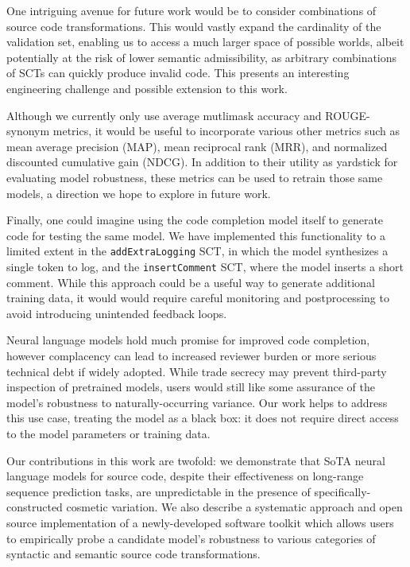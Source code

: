\documentclass{article} %
\begin{document}
One intriguing avenue for future work would be to consider combinations of source code transformations. This would vastly expand the cardinality of the validation set, enabling us to access a much larger space of possible worlds, albeit potentially at the risk of lower semantic admissibility, as arbitrary combinations of SCTs can quickly produce invalid code. This presents an interesting engineering challenge and possible extension to this work.

Although we currently only use average mutlimask accuracy and ROUGE-synonym metrics, it would be useful to incorporate various other metrics such as mean average precision (MAP), mean reciprocal rank (MRR), and normalized discounted cumulative gain (NDCG). In addition to their utility as yardstick for evaluating model robustness, these metrics can be used to retrain those same models, a direction we hope to explore in future work.

Finally, one could imagine using the code completion model itself to generate code for testing the same model. We have implemented this functionality to a limited extent in the \lstinline|addExtraLogging| SCT, in which the model synthesizes a single token to log, and the \lstinline|insertComment| SCT, where the model inserts a short comment. While this approach could be a useful way to generate additional training data, it would would require careful monitoring and postprocessing to avoid introducing unintended feedback loops.

Neural language models hold much promise for improved code completion, however complacency can lead to increased reviewer burden or more serious technical debt if widely adopted. While trade secrecy may prevent third-party inspection of pretrained models, users would still like some assurance of the model's robustness to naturally-occurring variance. Our work helps to address this use case, treating the model as a black box: it does not require direct access to the model parameters or training data.

Our contributions in this work are twofold: we demonstrate that SoTA neural language models for source code, despite their effectiveness on long-range sequence prediction tasks, are unpredictable in the presence of specifically-constructed cosmetic variation. We also describe a systematic approach and open source implementation of a newly-developed software toolkit which allows users to empirically probe a candidate model's robustness to various categories of syntactic and semantic source code transformations.
\pagebreak

\appendix
\end{document}
